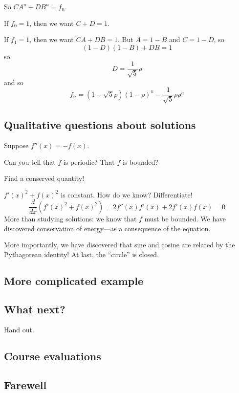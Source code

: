 \documentclass[12pt]{article}
\begin{document}
So $C A^n + D B^n = f_n$.

If $f_0 = 1$, then we want $C + D = 1$.

If $f_1 = 1$, then we want $CA + DB = 1$.  But $A = 1 - B$ and $C = 1 - D$, so
$$
(1-D)(1-B) + DB = 1
$$
so
$$
D = \frac{1}{\sqrt{5}} \rho
$$
and so
$$
f_n = (1 - \sqrt{5} \rho) (1-\rho)^n - \frac{1}{\sqrt{5}} \rho \rho^n
$$

\subsection*{Qualitative questions about solutions}

Suppose $f''(x) = -f(x)$.

Can you tell that $f$ is periodic?  That $f$ is bounded?

Find a conserved quantity!

$f'(x)^2 + f(x)^2$ is constant.  How do we know?  Differentiate!
$$
\frac{d}{dx} \left( f'(x)^2 + f(x)^2 \right) = 2 f''(x) f'(x) + 2 f'(x) f(x) = 0
$$
More than studying solutions: we know that $f$ must be bounded.  We
have discovered conservation of energy---as a consequence of the
equation.

More importantly, we have discovered that sine and cosine are related
by the Pythagorean identity!  At last, the ``circle'' is closed.

\subsection*{More complicated example}



\subsection*{What next?}

Hand out.

\subsection*{Course evaluations}

\subsection*{Farewell}
\end{document}
